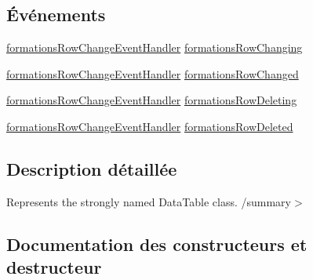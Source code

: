 \subsection*{Événements}
\begin{DoxyCompactItemize}
\item 
\hyperlink{classforma_1_1formadb_data_set_a5533167983db2bdb080cf9b8ea065fae}{formations\+Row\+Change\+Event\+Handler} \hyperlink{classforma_1_1formadb_data_set_1_1formations_data_table_a0794ea0d1f7ca81ae1f2ac528bdc8300}{formations\+Row\+Changing}
\item 
\hyperlink{classforma_1_1formadb_data_set_a5533167983db2bdb080cf9b8ea065fae}{formations\+Row\+Change\+Event\+Handler} \hyperlink{classforma_1_1formadb_data_set_1_1formations_data_table_a0f8c8a981ad1f5108f2e8c20baa4adb6}{formations\+Row\+Changed}
\item 
\hyperlink{classforma_1_1formadb_data_set_a5533167983db2bdb080cf9b8ea065fae}{formations\+Row\+Change\+Event\+Handler} \hyperlink{classforma_1_1formadb_data_set_1_1formations_data_table_acfae0c1f09c21faaae6766f4eb483bc6}{formations\+Row\+Deleting}
\item 
\hyperlink{classforma_1_1formadb_data_set_a5533167983db2bdb080cf9b8ea065fae}{formations\+Row\+Change\+Event\+Handler} \hyperlink{classforma_1_1formadb_data_set_1_1formations_data_table_aae20f1168d3617882d07f460f42c0cf1}{formations\+Row\+Deleted}
\end{DoxyCompactItemize}


\subsection{Description détaillée}
Represents the strongly named Data\+Table class. /summary$>$ 

\subsection{Documentation des constructeurs et destructeur}
